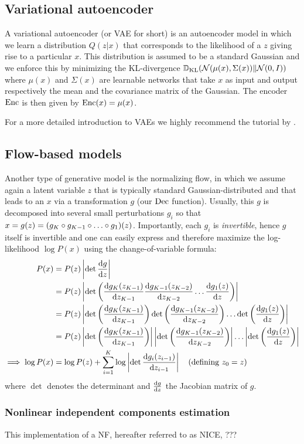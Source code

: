 \documentclass[../main.tex]{subfiles}
\begin{document}
\subsection{Variational autoencoder}

A variational autoencoder (or VAE for short) is an autoencoder model in which we learn a distribution $Q(z | x)$ that corresponds to the likelihood of a $z$ giving rise to a particular $x$.
This distribution is assumed to be a standard Gaussian and we enforce this by minimizing the KL-divergence $\mathbb{D}_\text{KL}(\mathcal{N}(\mu(x), \Sigma(x)) \| \mathcal{N}(0, I))$ where $\mu(x)$ and $\Sigma(x)$ are learnable networks that take $x$ as input and output respectively the mean and the covariance matrix of the Gaussian.
The encoder $\operatorname{Enc}$ is then given by $\operatorname{Enc}(x) = \mu(x)$.

For a more detailed introduction to VAEs we highly recommend the tutorial by \citeauthor{doerschTutorial2021} \cite{doerschTutorial2021}.

\subsection{Flow-based models}

Another type of generative model is the normalizing flow, in which we assume again a latent variable $z$ that is typically standard Gaussian-distributed and that leads to an $x$ via a transformation $g$ (our $\operatorname{Dec}$ function).
Usually, this $g$ is decomposed into several small perturbations $g_i$ so that $x = g(z) = (g_K \circ g_{K-1} \circ \ldots \circ g_1) (z)$.
Importantly, each $g_i$ is \emph{invertible}, hence $g$ itself is invertible and one can easily express and therefore maximize the log-likelihood $\log P(x)$ using the change-of-variable formula:
%
\begin{align*}
    P(x)               & = P(z) \left\lvert \det \frac{\mathrm{d} g}{\mathrm{d} z} \right\rvert       \\
                       & = P(z) \left\lvert \det \left(
        \frac{\mathrm{d} g_K(z_{K-1})}{\mathrm{d} z_{K-1}}
        \frac{\mathrm{d} g_{K-1}(z_{K-2})}{\mathrm{d} z_{K-2}}
        \ldots
        \frac{\mathrm{d} g_1(z)}{\mathrm{d} z}
    \right)\right\rvert                                                   \\
                       & = P(z) \left\lvert
        \det \left(
        \frac{\mathrm{d} g_K(z_{K-1})}{\mathrm{d} z_{K-1}}
        \right)
        \det \left(
        \frac{\mathrm{d} g_{K-1}(z_{K-2})}{\mathrm{d} z_{K-2}}
        \right)
        \ldots
        \det \left(
        \frac{\mathrm{d} g_1(z)}{\mathrm{d} z}
        \right)
    \right\rvert                                                          \\
                       & = P(z) \left\lvert
        \det \left(
        \frac{\mathrm{d} g_K(z_{K-1})}{\mathrm{d} z_{K-1}}
        \right)
    \right\rvert
    \left\lvert
        \det \left(
        \frac{\mathrm{d} g_{K-1}(z_{K-2})}{\mathrm{d} z_{K-2}}
        \right)
    \right\rvert
    \ldots
    \left\lvert
        \det \left(
        \frac{\mathrm{d} g_1(z)}{\mathrm{d} z}
        \right)
    \right\rvert                                                          \\
    \implies \log P(x) & = \log P(z) + \sum_{i=1}^K \log \left\lvert
        \det \frac{\mathrm{d} g_i(z_{i-1})}{\mathrm{d} z_{i-1}}
    \right\rvert\quad \text{(defining $z_0 = z$)}
\end{align*}
where $\det$ denotes the determinant and $\frac{\mathrm{d} g}{\mathrm{d} z}$ the Jacobian matrix of $g$.

\subsubsection{Nonlinear independent components estimation}
This implementation of a NF, hereafter referred to as NICE, ???
\end{document}
